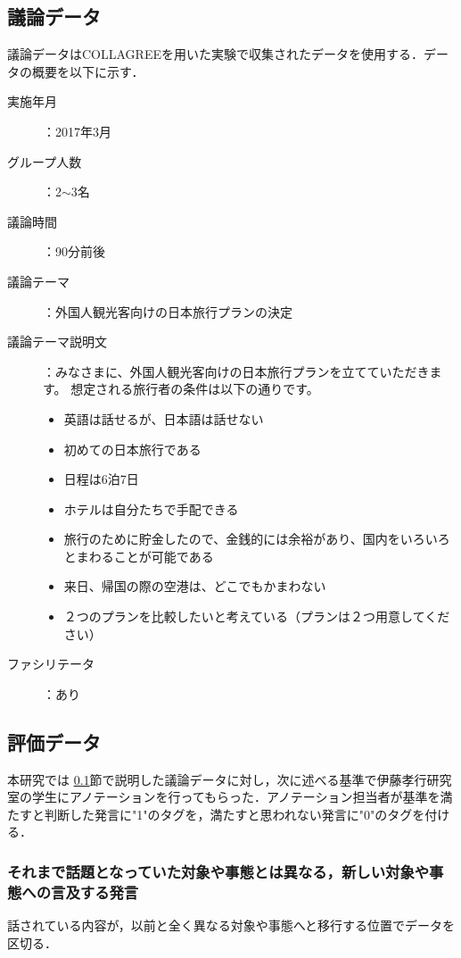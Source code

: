 \subsection{議論データ}
\label{exp:data:discussion}
議論データはCOLLAGREEを用いた実験で収集されたデータを使用する．データの概要を以下に示す．
\\
\begin{description}
\item [実施年月]：2017年3月
\item [グループ人数]：2$\sim$3名
\item [議論時間]：90分前後
\item [議論テーマ]：外国人観光客向けの日本旅行プランの決定
\item [議論テーマ説明文]：みなさまに、外国人観光客向けの日本旅行プランを立てていただきます。 想定される旅行者の条件は以下の通りです。
\begin{itemize}
\item 英語は話せるが、日本語は話せない
\item 初めての日本旅行である
\item 日程は6泊7日
\item ホテルは自分たちで手配できる
\item 旅行のために貯金したので、金銭的には余裕があり、国内をいろいろとまわることが可能である
\item 来日、帰国の際の空港は、どこでもかまわない
\item ２つのプランを比較したいと考えている（プランは２つ用意してください）
\end{itemize}
\item [ファシリテータ]：あり
\end{description}

\subsection{評価データ}
\label{exp:data:evaluation}
本研究では \ref{exp:data:discussion}節で説明した議論データに対し，次に述べる基準で伊藤孝行研究室の学生にアノテーションを行ってもらった．アノテーション担当者が基準を満たすと判断した発言に"1"のタグを，満たすと思われない発言に"0"のタグを付ける．
\subsubsection*{ それまで話題となっていた対象や事態とは異なる，新しい対象や事態への言及する発言}
話されている内容が，以前と全く異なる対象や事態へと移行する位置でデータを区切る．
